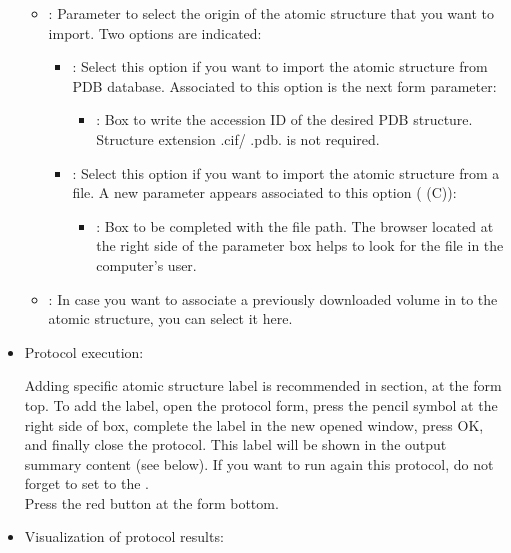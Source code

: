 \begin{itemize}
  \begin{itemize}
   \item {}: Parameter to select the origin of the atomic structure that you want to import. Two options are indicated:
    \begin{itemize}
	 \item {}: Select this option if you want to import the atomic structure from PDB database. Associated to this option is the next form parameter:
	  \begin{itemize}
	   \item {}: Box to write the accession ID of the desired PDB structure. Structure extension .cif/ .pdb. is not required.
	  \end{itemize}
	 \item {}: Select this option if you want to import the atomic structure from a file. A new parameter appears associated to this option ( (C)):
	  \begin{itemize}
	   \item {}: Box to be completed with the file path. The browser located at the right side of the parameter box helps to look for the file in the computer's user. 
	  \end{itemize}
	\end{itemize}
   \item {}: In case you want to associate a previously downloaded volume in \scipion to the atomic structure, you can select it here.
   \end{itemize}

  \item Protocol execution:
  
  Adding specific atomic structure label is recommended in  section, at the form top. To add the label, open the protocol form, press the pencil symbol at the right side of  box, complete the label in the new opened window, press OK, and finally close the protocol. This label will be shown in the output summary content (see below). If you want to run again this protocol, do not forget to set to  the .\\
  Press the  red button at the form bottom.
  
  \item Visualization of protocol results:
  

\end{itemize}

